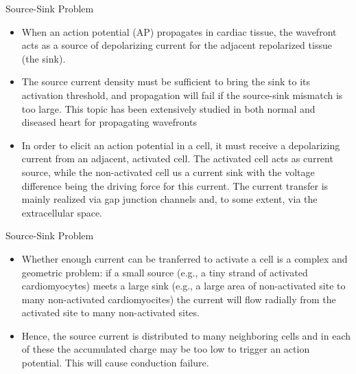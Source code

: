 \documentclass[unknownkeysallowed]{beamer}
\begin{document}
    \begin{frame}{Source-Sink Problem}
      \begin{itemize}
	      \item When an action potential (AP) propagates in cardiac tissue, the wavefront acts as a source of depolarizing current for the adjacent repolarized tissue (the sink). \newline
	      
	      \item The source current density must be sufficient to bring the sink to its activation threshold, and propagation will fail if the source-sink mismatch is too large. This topic has been extensively studied in both normal and diseased heart for propagating wavefronts  \newline
	      
	      \item In order to elicit an action potential in a cell, it must receive a depolarizing current from an adjacent, activated cell. The activated cell acts as current source, while the non-activated cell us a current sink with the voltage difference being the driving force for this current. The current transfer is mainly realized via gap junction channels and, to some extent, via the extracellular space. 
      \end{itemize}
    \end{frame}
    
    \begin{frame}{Source-Sink Problem}
	    \begin{itemize}
	    \item Whether enough current can be tranferred to activate a cell is a complex and geometric problem: if a small source (e.g., a tiny strand of activated cardiomyocytes) meets a large sink (e.g., a large area of non-activated site to many non-activated cardiomyocites) the current will flow radially from the activated site to many non-activated sites. \newline
	    
	    \item Hence, the source current is distributed to many neighboring cells and in each of these the accumulated charge may be too low to trigger an action potential. This will cause conduction failure.
	    \end{itemize}
    \end{frame}
    
\end{document}
